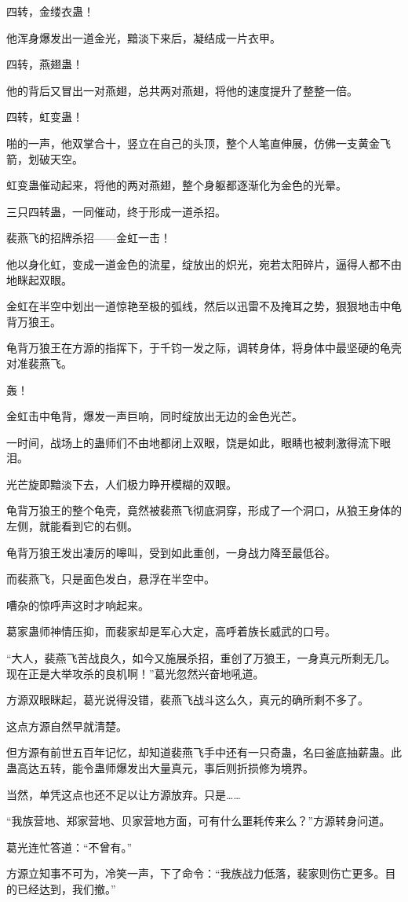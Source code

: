 \begin{this_body}
四转，金缕衣蛊！

他浑身爆发出一道金光，黯淡下来后，凝结成一片衣甲。

四转，燕翅蛊！

他的背后又冒出一对燕翅，总共两对燕翅，将他的速度提升了整整一倍。

四转，虹变蛊！

啪的一声，他双掌合十，竖立在自己的头顶，整个人笔直伸展，仿佛一支黄金飞箭，划破天空。

虹变蛊催动起来，将他的两对燕翅，整个身躯都逐渐化为金色的光晕。

三只四转蛊，一同催动，终于形成一道杀招。

裴燕飞的招牌杀招——金虹一击！

他以身化虹，变成一道金色的流星，绽放出的炽光，宛若太阳碎片，逼得人都不由地眯起双眼。

金虹在半空中划出一道惊艳至极的弧线，然后以迅雷不及掩耳之势，狠狠地击中龟背万狼王。

龟背万狼王在方源的指挥下，于千钧一发之际，调转身体，将身体中最坚硬的龟壳对准裴燕飞。

轰！

金虹击中龟背，爆发一声巨响，同时绽放出无边的金色光芒。

一时间，战场上的蛊师们不由地都闭上双眼，饶是如此，眼睛也被刺激得流下眼泪。

光芒旋即黯淡下去，人们极力睁开模糊的双眼。

龟背万狼王的整个龟壳，竟然被裴燕飞彻底洞穿，形成了一个洞口，从狼王身体的左侧，就能看到它的右侧。

龟背万狼王发出凄厉的嗥叫，受到如此重创，一身战力降至最低谷。

而裴燕飞，只是面色发白，悬浮在半空中。

嘈杂的惊呼声这时才响起来。

葛家蛊师神情压抑，而裴家却是军心大定，高呼着族长威武的口号。

“大人，裴燕飞苦战良久，如今又施展杀招，重创了万狼王，一身真元所剩无几。现在正是大举攻杀的良机啊！”葛光忽然兴奋地吼道。

方源双眼眯起，葛光说得没错，裴燕飞战斗这么久，真元的确所剩不多了。

这点方源自然早就清楚。

但方源有前世五百年记忆，却知道裴燕飞手中还有一只奇蛊，名曰釜底抽薪蛊。此蛊高达五转，能令蛊师爆发出大量真元，事后则折损修为境界。

当然，单凭这点也还不足以让方源放弃。只是……

“我族营地、郑家营地、贝家营地方面，可有什么噩耗传来么？”方源转身问道。

葛光连忙答道：“不曾有。”

方源立知事不可为，冷笑一声，下了命令：“我族战力低落，裴家则伤亡更多。目的已经达到，我们撤。”

\end{this_body}

